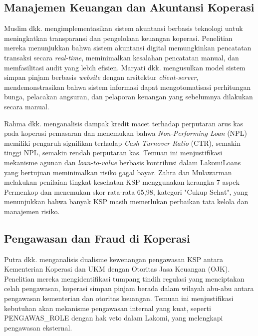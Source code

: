 \subsection{Manajemen Keuangan dan Akuntansi Koperasi}

Muslim dkk. \cite{muslim2024implementasi} mengimplementasikan sistem akuntansi berbasis teknologi untuk meningkatkan transparansi dan pengelolaan keuangan koperasi. Penelitian mereka menunjukkan bahwa sistem akuntansi digital memungkinkan pencatatan transaksi secara \textit{real-time}, meminimalkan kesalahan pencatatan manual, dan memfasilitasi audit yang lebih efisien. Maryati dkk. \cite{maryati2024model} mengusulkan model sistem simpan pinjam berbasis \textit{website} dengan arsitektur \textit{client-server}, mendemonstrasikan bahwa sistem informasi dapat mengotomatisasi perhitungan bunga, pelacakan angsuran, dan pelaporan keuangan yang sebelumnya dilakukan secara manual.

Rahma dkk. \cite{rahma2026analisis} menganalisis dampak kredit macet terhadap perputaran arus kas pada koperasi pemasaran dan menemukan bahwa \textit{Non-Performing Loan} (NPL) memiliki pengaruh signifikan terhadap \textit{Cash Turnover Ratio} (CTR), semakin tinggi NPL, semakin rendah perputaran kas. Temuan ini menjustifikasi mekanisme agunan dan \textit{loan-to-value} berbasis kontribusi dalam LakomiLoans yang bertujuan meminimalkan risiko gagal bayar. Zahra dan Mulawarman \cite{zahra2021penilaian} melakukan penilaian tingkat kesehatan KSP menggunakan kerangka 7 aspek Permenkop dan menemukan skor rata-rata 65,98, kategori "Cukup Sehat", yang menunjukkan bahwa banyak KSP masih memerlukan perbaikan tata kelola dan manajemen risiko.

\subsection{Pengawasan dan Fraud di Koperasi}

Putra dkk. \cite{putra2025dualisme} menganalisis dualisme kewenangan pengawasan KSP antara Kementerian Koperasi dan UKM dengan Otoritas Jasa Keuangan (OJK). Penelitian mereka mengidentifikasi tumpang tindih regulasi yang menciptakan celah pengawasan, koperasi simpan pinjam berada dalam wilayah abu-abu antara pengawasan kementerian dan otoritas keuangan. Temuan ini menjustifikasi kebutuhan akan mekanisme pengawasan internal yang kuat, seperti PENGAWAS\_ROLE dengan hak veto dalam Lakomi, yang melengkapi pengawasan eksternal.

